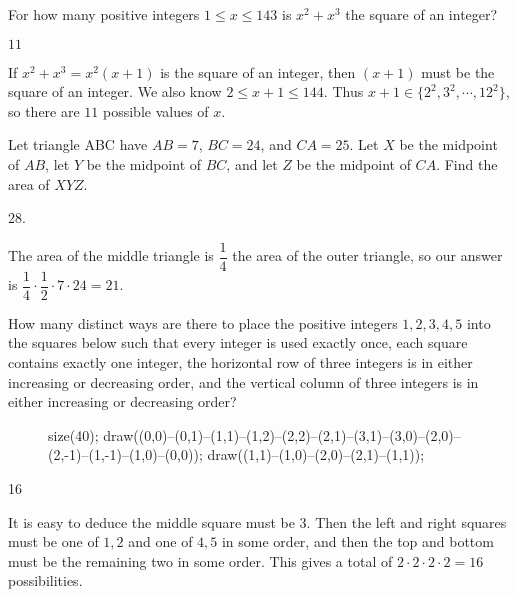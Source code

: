 \documentclass[11pt]{article}
\begin{document}
\begin{problem}
For how many positive integers $1 \le x \le 143$ is $x^2 + x^3$ the square of an integer? 
\end{problem}
\begin{answer}
$\boxed{11}$
\end{answer}
\begin{solution}
If $x^2 + x^3 = x^2(x+1)$ is the square of an integer, then $(x+1)$ must be the square of an integer. We also know $2 \le x+1 \le 144$. Thus $x+1 \in \{2^2, 3^2, \cdots, 12^2\}$, so there are $11$ possible values of $x$.
\end{solution}


\begin{problem}
Let triangle ABC have $AB = 7$, $BC = 24$, and $CA = 25$. Let $X$ be the midpoint of $AB$, let $Y$ be the midpoint of $BC$, and let $Z$ be the midpoint of $CA$. Find the area of $XYZ$. 
\end{problem}
\begin{answer}
$28$. 
\end{answer}
\begin{solution}
The area of the middle triangle is $\dfrac{1}{4}$ the area of the outer triangle, so our answer is $\dfrac{1}{4} \cdot \dfrac{1}{2} \cdot 7 \cdot 24 = 21$. 
\end{solution}


\begin{problem}
How many distinct ways are there to place the positive integers $1, 2, 3, 4, 5$ into the squares below such that every integer is used exactly once, each square contains exactly one integer, the horizontal row of three integers is in either increasing or decreasing order, and the vertical column of three integers is in either increasing or decreasing order?
\begin{figure}[H]
	\begin{center}
	\begin{asy}
	size(40);
	draw((0,0)--(0,1)--(1,1)--(1,2)--(2,2)--(2,1)--(3,1)--(3,0)--(2,0)--(2,-1)--(1,-1)--(1,0)--(0,0));
	draw((1,1)--(1,0)--(2,0)--(2,1)--(1,1));
	\end{asy}
	\end{center}
\end{figure}
\end{problem}

\begin{answer}
16
\end{answer}
\begin{solution}
It is easy to deduce the middle square must be $3$. Then the left and right squares must be one of ${1,2}$ and one of ${4,5}$ in some order, and then the top and bottom must be the remaining two in some order. This gives a total of $2 \cdot 2 \cdot 2 \cdot 2 = 16$ possibilities.
\end{solution}
\end{document}
